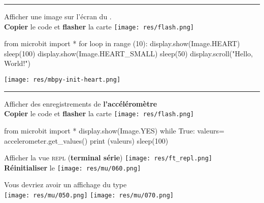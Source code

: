 \begin{minipage}[t]{0.5\linewidth}
\begin{methode}\rule{-0.25em}{1.6em}
		Afficher une image sur l'écran du \mb.
		\\[1em]

		\textbf{Copier} le code et 
		\textbf{flasher} la carte
		\hfill\texttt{[image: res/flash.png]}

\begin{mucode}
from microbit import *
for loop in range (10):
	display.show(Image.HEART)
	sleep(100)
	display.show(Image.HEART_SMALL)
	sleep(50)
display.scroll("Hello, World!")
\end{mucode}

	\begin{center}
		\texttt{[image: res/mbpy-init-heart.png]}
	\end{center}
\end{methode}
\end{minipage}
%
%
\begin{minipage}[t]{0.5\linewidth}
\begin{methode}\rule{-0.25em}{1.6em}
	Afficher des enregistrements de \textbf{l'accéléromètre}
	\\[1em]

	\textbf{Copier} le code et
	\textbf{flasher} la carte
	\hfill\texttt{[image: res/flash.png]}\\
	\begin{mucode}
from microbit import *
display.show(Image.YES)
while True:
    valeurs= accelerometer.get_values()
    print (valeurs)
    sleep(100)
	\end{mucode}

	Afficher la vue \textsc{repl} (\textbf{terminal série})
	\hfill\texttt{[image: res/ft\_repl.png]}\\
	\textbf{Réinitialiser} le \mb
	\hfill\texttt{[image: res/mu/060.png]}

\end{methode}
\end{minipage}


\begin{remarque}
	Vous devriez avoir un affichage du type\\
		\hfill
		\texttt{[image: res/mu/050.png]}
		\texttt{[image: res/mu/070.png]}
		\hfill	
\end{remarque}




